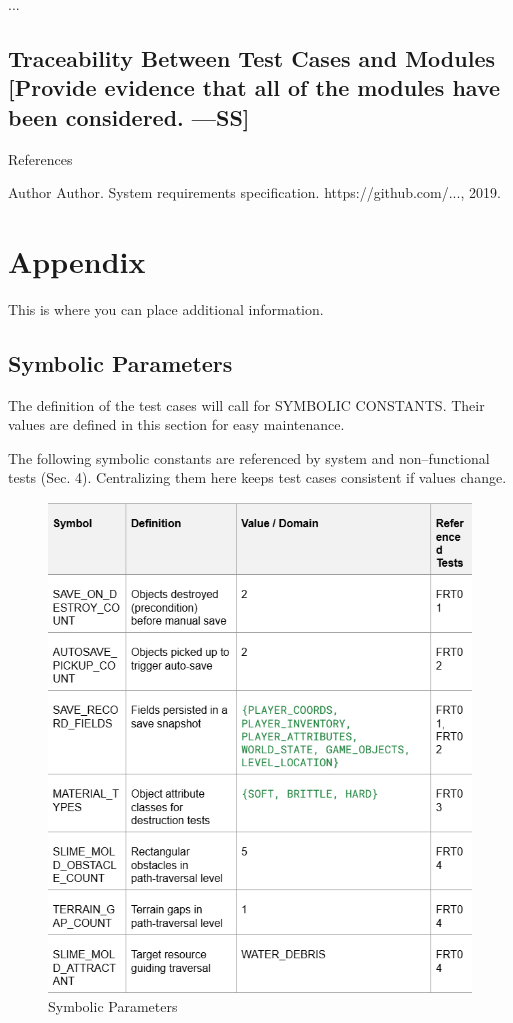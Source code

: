 \documentclass[12pt, titlepage]{article}
\begin{document}
...

\subsection{Traceability Between Test Cases and Modules [Provide evidence that all of the modules have been considered. —SS]}

References

Author Author. System requirements specification. https://github.com/..., 2019.

\section{Appendix}

This is where you can place additional information.

\subsection{Symbolic Parameters}

The definition of the test cases will call for SYMBOLIC CONSTANTS. Their values are defined in this section for easy maintenance.

The following symbolic constants are referenced by system and non--functional tests (Sec. 4). Centralizing them here keeps test cases consistent if values change.

\begin{figure}[H]
\centering
\includegraphics[width=\linewidth, height=0.8\textheight, keepaspectratio]{table.png}
\caption{Symbolic Parameters}
\label{tab:symbolic--parameters}
\end{figure}
\end{document}
